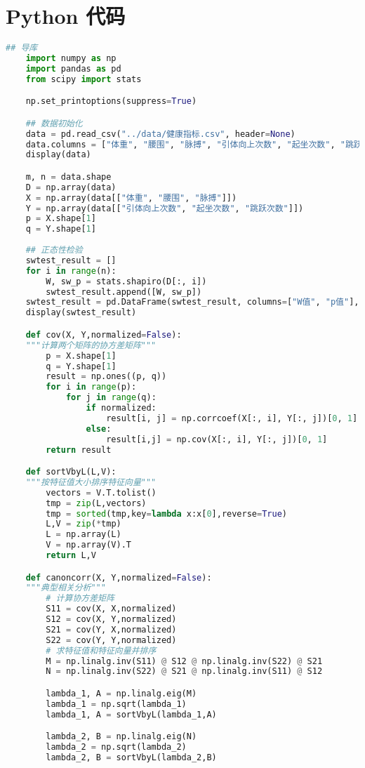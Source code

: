 \documentclass[withoutpreface]{cumcmthesis}
\begin{document}
\section{Python 代码}
\begin{lstlisting}[language=python ]
    ## 导库
    import numpy as np
    import pandas as pd
    from scipy import stats

    np.set_printoptions(suppress=True)

    ## 数据初始化
    data = pd.read_csv("../data/健康指标.csv", header=None)
    data.columns = ["体重", "腰围", "脉搏", "引体向上次数", "起坐次数", "跳跃次数"]
    display(data)

    m, n = data.shape
    D = np.array(data)
    X = np.array(data[["体重", "腰围", "脉搏"]])
    Y = np.array(data[["引体向上次数", "起坐次数", "跳跃次数"]])
    p = X.shape[1]
    q = Y.shape[1]
    
    ## 正态性检验
    swtest_result = []
    for i in range(n):
        W, sw_p = stats.shapiro(D[:, i])
        swtest_result.append([W, sw_p])
    swtest_result = pd.DataFrame(swtest_result, columns=["W值", "p值"], index=data.columns)
    display(swtest_result)

    def cov(X, Y,normalized=False):
    """计算两个矩阵的协方差矩阵"""
        p = X.shape[1]
        q = Y.shape[1]
        result = np.ones((p, q))
        for i in range(p):
            for j in range(q):
                if normalized:
                    result[i, j] = np.corrcoef(X[:, i], Y[:, j])[0, 1]
                else:
                    result[i,j] = np.cov(X[:, i], Y[:, j])[0, 1]
        return result

    def sortVbyL(L,V):
    """按特征值大小排序特征向量"""
        vectors = V.T.tolist()
        tmp = zip(L,vectors)
        tmp = sorted(tmp,key=lambda x:x[0],reverse=True)
        L,V = zip(*tmp)
        L = np.array(L)
        V = np.array(V).T
        return L,V

    def canoncorr(X, Y,normalized=False):
    """典型相关分析"""
        # 计算协方差矩阵
        S11 = cov(X, X,normalized)
        S12 = cov(X, Y,normalized)
        S21 = cov(Y, X,normalized)
        S22 = cov(Y, Y,normalized)
        # 求特征值和特征向量并排序
        M = np.linalg.inv(S11) @ S12 @ np.linalg.inv(S22) @ S21
        N = np.linalg.inv(S22) @ S21 @ np.linalg.inv(S11) @ S12

        lambda_1, A = np.linalg.eig(M)
        lambda_1 = np.sqrt(lambda_1)
        lambda_1, A = sortVbyL(lambda_1,A)

        lambda_2, B = np.linalg.eig(N)
        lambda_2 = np.sqrt(lambda_2)
        lambda_2, B = sortVbyL(lambda_2,B)


\end{lstlisting}
\end{document}
